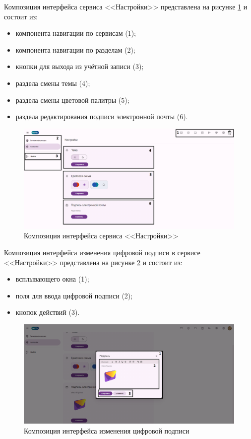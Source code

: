 Композиция интерфейса сервиса <<Настройки>> представлена на рисунке \ref{templ:image6} и состоит из:
\begin{itemize}
  \item компонента навигации по сервисам (1);
  \item компонента навигации по разделам (2);
  \item кнопки для выхода из учётной записи (3);
  \item раздела смены темы (4);
  \item раздела смены цветовой палитры (5);
  \item раздела редактирования подписи электронной почты (6).
\end{itemize}
\begin{figure}[H]
	\centering
	\includegraphics[width=1\linewidth]{images/настройки}
	\caption{Композиция интерфейса сервиса <<Настройки>>}
	\label{templ:image6}
\end{figure}

Композиция интерфейса изменения цифровой подписи в сервисе <<Настройки>> представлена на рисунке \ref{templ:image6b} и состоит из:
\begin{itemize}
  \item всплывающего окна (1);
  \item поля для ввода цифровой подписи (2);
  \item кнопок действий (3).
\end{itemize}
\begin{figure}[H]
	\centering
	\includegraphics[width=1\linewidth]{images/настройки2}
	\caption{Композиция интерфейса изменения цифровой подписи}
	\label{templ:image6b}
\end{figure}

